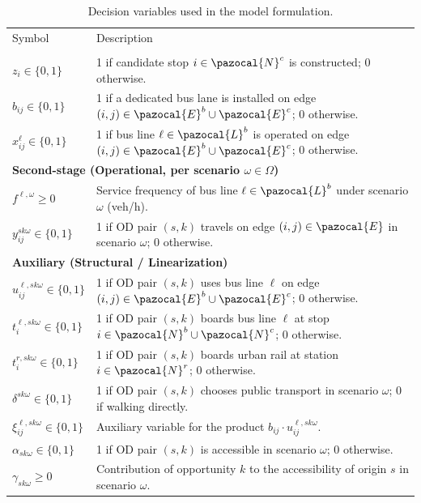 \documentclass[3p,times,procedia]{elsarticle}
\begin{document}
\begin{table}[h]
\caption{Decision variables used in the model formulation.}
\begin{tabularx}{\hsize}{@{\extracolsep{\fill}}lX@{}}
\toprule
Symbol & Description \\
\colrule
\multicolumn{2}{l}{\textbf{First-stage (Design)}} \\
$z_i \in \{0,1\}$ & 1 if candidate stop $i \in \pazocal{N}^c$ is constructed; 0 otherwise. \\
$b_{ij} \in \{0,1\}$ & 1 if a dedicated bus lane is installed on edge $(i,j) \in \pazocal{E}^b \cup \pazocal{E}^c$; 0 otherwise. \\
$x_{ij}^\ell \in \{0,1\}$ & 1 if bus line $\ell \in \pazocal{L}^b$ is operated on edge $(i,j) \in \pazocal{E}^b \cup \pazocal{E}^c$; 0 otherwise. \\

\multicolumn{2}{l}{\textbf{Second-stage (Operational, per scenario $\omega \in \Omega$)}} \\
$f^{\ell,\omega} \geq 0$ & Service frequency of bus line $\ell \in \pazocal{L}^b$ under scenario $\omega$ (veh/h). \\
$y_{ij}^{sk\omega} \in \{0,1\}$ & 1 if OD pair $(s,k)$ travels on edge $(i,j) \in \pazocal{E}$ in scenario $\omega$; 0 otherwise. \\

\multicolumn{2}{l}{\textbf{Auxiliary (Structural / Linearization)}} \\
$u_{ij}^{\ell,sk\omega} \in \{0,1\}$ & 1 if OD pair $(s,k)$ uses bus line $\ell$ on edge $(i,j) \in \pazocal{E}^b \cup \pazocal{E}^c$; 0 otherwise. \\
$t_i^{\ell,sk\omega} \in \{0,1\}$ & 1 if OD pair $(s,k)$ boards bus line $\ell$ at stop $i \in \pazocal{N}^b \cup \pazocal{N}^c$; 0 otherwise. \\
$t_i^{r,sk\omega} \in \{0,1\}$ & 1 if OD pair $(s,k)$ boards urban rail at station $i \in \pazocal{N}^r$; 0 otherwise. \\
$\delta^{sk\omega} \in \{0,1\}$ & 1 if OD pair $(s,k)$ chooses public transport in scenario $\omega$; 0 if walking directly. \\
$\xi_{ij}^{\ell,sk\omega} \in \{0,1\}$ & Auxiliary variable for the product $b_{ij} \cdot u_{ij}^{\ell,sk\omega}$. \\
$\alpha_{sk\omega} \in \{0,1\}$ & 1 if OD pair $(s,k)$ is accessible in scenario $\omega$; 0 otherwise. \\
$\gamma_{sk\omega} \geq 0$ & Contribution of opportunity $k$ to the accessibility of origin $s$ in scenario $\omega$. \\


\end{tabularx}
\end{table}
\end{document}
